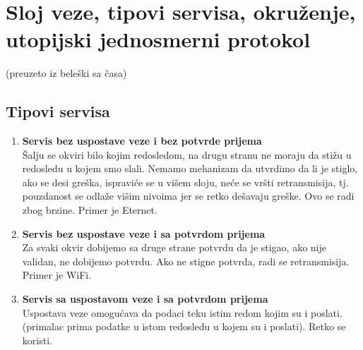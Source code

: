 \documentclass{article} %
\begin{document}
\section{Sloj veze, tipovi servisa, okruženje, utopijski jednosmerni protokol}
(preuzeto iz beleški sa časa)\\

\subsection{Tipovi servisa}

\begin{enumerate}
  \item \textbf{Servis bez uspostave veze i bez potvrde prijema}\\
  Šalju se okviri bilo kojim redosledom, na drugu stranu ne moraju da stižu u redosledu u kojem smo slali. Nemamo mehanizam da utvrdimo da li je stiglo, ako se desi greška, ispraviće se u višem sloju, neće se vršti retransmisija, tj. pouzdanost se odlaže višim nivoima jer se retko dešavaju greške. Ovo se radi zbog brzine. Primer je Eternet.
  \item \textbf{Servis bez uspostave veze i sa potvrdom prijema}\\
  Za svaki okvir dobijemo sa druge strane potvrdu da je stigao, ako nije validan, ne dobijemo potvrdu. Ako ne stigne potvrda, radi se retransmisija. Primer je WiFi.
  \item \textbf{Servis sa uspostavom veze i sa potvrdom prijema}\\
  Uspostava veze omogućava da podaci teku istim redom kojim su i poslati. (primalac prima podatke u istom redosledu u kojem su i poslati). Retko se koristi.
\end{enumerate}
\end{document}
